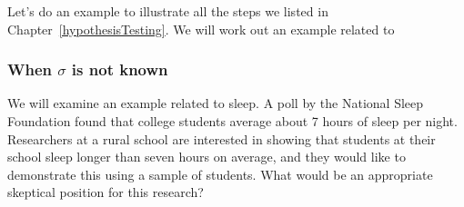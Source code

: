 %
%
%






Let's do an example to illustrate all the steps we listed in Chapter~\ref{hypothesisTesting}.
We will work out an example related to 



\subsubsection{When $\sigma$ is not known}

We will examine an example related to sleep.
A poll by the National Sleep Foundation found that college students average about 7 hours of sleep per night. Researchers at a rural school are interested in showing that students at their school sleep longer than seven hours on average, and they would like to demonstrate this using a sample of students. What would be an appropriate skeptical position for this research?

